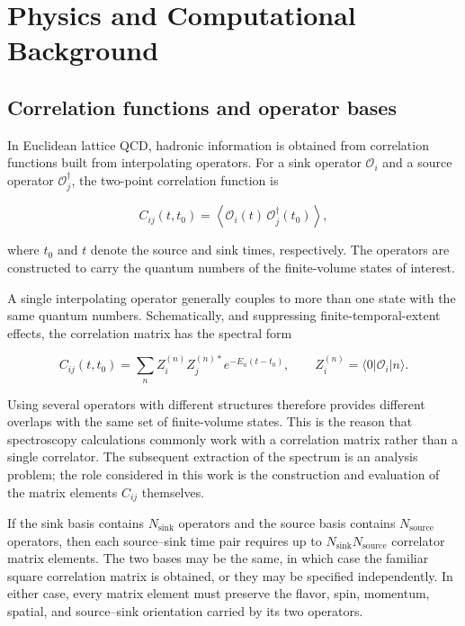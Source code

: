 \documentclass[11pt]{article}
\begin{document}
\section{Physics and Computational Background}
\label{sec:background}


\subsection{Correlation functions and operator bases}

In Euclidean lattice QCD, hadronic information is obtained from correlation
functions built from interpolating operators. For a sink operator
\(\mathcal O_i\) and a source operator \(\mathcal O_j^\dagger\), the two-point
correlation function is

\begin{equation}
C_{ij}(t,t_0)
=
\left\langle
\mathcal O_i(t)\,\mathcal O_j^\dagger(t_0)
\right\rangle ,
\label{eq:two_point_matrix}
\end{equation}

where \(t_0\) and \(t\) denote the source and sink times, respectively. The
operators are constructed to carry the quantum numbers of the finite-volume
states of interest.

A single interpolating operator generally couples to more than one state with
the same quantum numbers. Schematically, and suppressing finite-temporal-extent
effects, the correlation matrix has the spectral form

\begin{equation}
C_{ij}(t,t_0)
=
\sum_n
Z_i^{(n)} Z_j^{(n)*}
 e^{-E_n(t-t_0)},
\qquad
Z_i^{(n)}=\langle 0|\mathcal O_i|n\rangle .
\label{eq:spectral_decomposition}
\end{equation}

Using several operators with different structures therefore provides different
overlaps with the same set of finite-volume states. This is the reason that
spectroscopy calculations commonly work with a correlation matrix rather than
a single correlator. The subsequent extraction of the spectrum is an analysis
problem; the role considered in this work is the construction and evaluation
of the matrix elements \(C_{ij}\) themselves.

If the sink basis contains \(N_{\mathrm{sink}}\) operators and the source basis
contains \(N_{\mathrm{source}}\) operators, then each source--sink time pair
requires up to
\(N_{\mathrm{sink}}N_{\mathrm{source}}\) correlator matrix elements. The two
bases may be the same, in which case the familiar square correlation matrix is
obtained, or they may be specified independently. In either case, every matrix
element must preserve the flavor, spin, momentum, spatial, and source--sink
orientation carried by its two operators.
\end{document}
